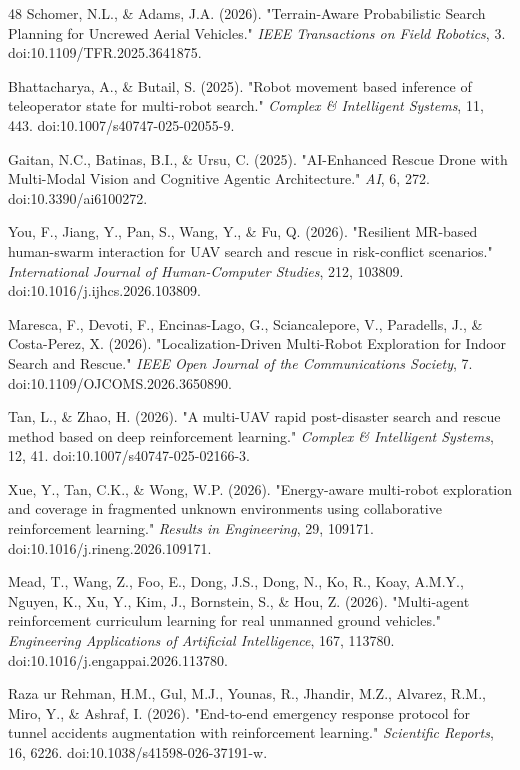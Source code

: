 \documentclass[journal]{IEEEtran}
\begin{document}
\begin{thebibliography}{48}
Schomer, N.L., \& Adams, J.A. (2026). "Terrain-Aware Probabilistic Search Planning for Uncrewed Aerial Vehicles." \textit{IEEE Transactions on Field Robotics}, 3. doi:10.1109/TFR.2025.3641875.

Bhattacharya, A., \& Butail, S. (2025). "Robot movement based inference of teleoperator state for multi-robot search." \textit{Complex \& Intelligent Systems}, 11, 443. doi:10.1007/s40747-025-02055-9.

Gaitan, N.C., Batinas, B.I., \& Ursu, C. (2025). "AI-Enhanced Rescue Drone with Multi-Modal Vision and Cognitive Agentic Architecture." \textit{AI}, 6, 272. doi:10.3390/ai6100272.

You, F., Jiang, Y., Pan, S., Wang, Y., \& Fu, Q. (2026). "Resilient MR-based human-swarm interaction for UAV search and rescue in risk-conflict scenarios." \textit{International Journal of Human-Computer Studies}, 212, 103809. doi:10.1016/j.ijhcs.2026.103809.

Maresca, F., Devoti, F., Encinas-Lago, G., Sciancalepore, V., Paradells, J., \& Costa-Perez, X. (2026). "Localization-Driven Multi-Robot Exploration for Indoor Search and Rescue." \textit{IEEE Open Journal of the Communications Society}, 7. doi:10.1109/OJCOMS.2026.3650890.

Tan, L., \& Zhao, H. (2026). "A multi-UAV rapid post-disaster search and rescue method based on deep reinforcement learning." \textit{Complex \& Intelligent Systems}, 12, 41. doi:10.1007/s40747-025-02166-3.

Xue, Y., Tan, C.K., \& Wong, W.P. (2026). "Energy-aware multi-robot exploration and coverage in fragmented unknown environments using collaborative reinforcement learning." \textit{Results in Engineering}, 29, 109171. doi:10.1016/j.rineng.2026.109171.

Mead, T., Wang, Z., Foo, E., Dong, J.S., Dong, N., Ko, R., Koay, A.M.Y., Nguyen, K., Xu, Y., Kim, J., Bornstein, S., \& Hou, Z. (2026). "Multi-agent reinforcement curriculum learning for real unmanned ground vehicles." \textit{Engineering Applications of Artificial Intelligence}, 167, 113780. doi:10.1016/j.engappai.2026.113780.

Raza ur Rehman, H.M., Gul, M.J., Younas, R., Jhandir, M.Z., Alvarez, R.M., Miro, Y., \& Ashraf, I. (2026). "End-to-end emergency response protocol for tunnel accidents augmentation with reinforcement learning." \textit{Scientific Reports}, 16, 6226. doi:10.1038/s41598-026-37191-w.


\end{thebibliography}
\end{document}
